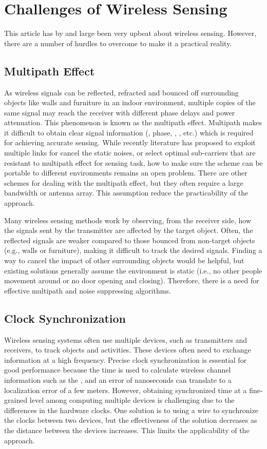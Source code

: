 \section{Challenges of Wireless Sensing}
This article has by and large been very upbeat about wireless sensing. However, there are a number of hurdles to overcome to make it a
practical reality.

\subsection{Multipath Effect}

As wireless signals can be reflected, refracted and bounced off surrounding objects like walls and furniture in an indoor environment,
multiple copies of the same signal may reach the receiver with different phase delays and power attenuation. This phenomenon is known as
the multipath effect. Multipath makes it difficult to obtain clear signal information (\RSSI, phase, \AoA, \ToF, etc.) which is required
for achieving accurate sensing. While recently literature has proposed to exploit multiple links for cancel the static noises, or select
optimal sub-carriers that are resistant to multipath effect for sensing task, how to make sure the scheme can be portable to different
environments remains an open problem. There are other schemes for dealing with the multipath effect, but they often require a large
bandwidth or antenna array. This assumption reduce the practicability of the approach.


Many wireless sensing methods work by observing, from the receiver side, how the signals sent by the transmitter are affected by the target
object. Often, the reflected signals are weaker compared to those bounced from non-target objects (e.g., walls or furniture), making it
difficult to track the desired signals. Finding a way to cancel the impact of other surrounding objects would be helpful, but existing
solutions generally assume the environment is static (i.e., no other people movement around or no door opening and closing). Therefore,
there is a need for effective multipath and noise suppressing algorithms.


\subsection{Clock Synchronization} Wireless sensing systems often use multiple devices, such as transmitters and receivers, to track
objects and activities. These devices often need to exchange information at a high frequency. Precise clock synchronization is essential
for good performance because the time is used to calculate wireless channel information such as the \ToF, and an error of nanoseconds can
translate to a localization error of a few meters. However, obtaining synchronized time at a fine-grained level among computing multiple
devices is challenging due to the differences in the hardware clocks. One solution is to using a wire to synchronize the clocks between two
devices, but the effectiveness of the solution decreases as the distance between the devices increases. This limits the applicability of
the approach.

